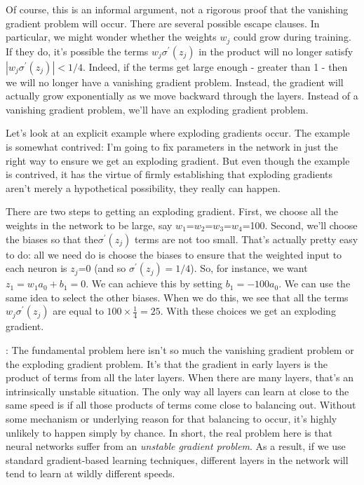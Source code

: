 Of course, this is an informal argument, not a rigorous proof that the vanishing gradient problem will occur. There are several possible escape clauses. In particular, we might wonder whether the weights $w_j$ could grow during training. If they do, it's possible the terms $w_{j} \sigma^{\prime}\left(z_{j}\right)$ in the product will no longer satisfy $\left|w_{j} \sigma^{\prime}\left(z_{j}\right)\right|<1 / 4$. Indeed, if the terms get large enough - greater than 1 - then we will no longer have a vanishing gradient problem. Instead, the gradient will actually grow exponentially as we move backward through the layers. Instead of a vanishing gradient problem, we'll have an exploding gradient problem.

 Let's look at an explicit example where exploding gradients occur. The example is somewhat contrived: I'm going to fix parameters in the network in just the right way to ensure we get an exploding gradient. But even though the example is contrived, it has the virtue of firmly establishing that exploding gradients aren't merely a hypothetical possibility, they really can happen.

There are two steps to getting an exploding gradient. First, we choose all the weights in the network to be large, say $w_1$=$w_2$=$w_3$=$w_4$=100. Second, we'll choose the biases so that the$\sigma^{\prime}\left(z_{j}\right)$ terms are not too small. That's actually pretty easy to do: all we need do is choose the biases to ensure that the weighted input to each neuron is $z_j$=0 (and so $\sigma^{\prime}\left(z_{j}\right)=1 / 4$). So, for instance, we want $z_{1}=w_{1} a_{0}+b_{1}=0$. We can achieve this by setting $b_{1}=-100  a_{0}$. We can use the same idea to select the other biases. When we do this, we see that all the terms $w_{j} \sigma^{\prime}\left(z_{j}\right)$ are equal to $100 \times\frac{1}{4}=25$. With these choices we get an exploding gradient.

: The fundamental problem here isn't so much the vanishing gradient problem or the exploding gradient problem. It's that the gradient in early layers is the product of terms from all the later layers. When there are many layers, that's an intrinsically unstable situation. The only way all layers can learn at close to the same speed is if all those products of terms come close to balancing out. Without some mechanism or underlying reason for that balancing to occur, it's highly unlikely to happen simply by chance. In short, the real problem here is that neural networks suffer from an \textit{unstable gradient problem}. As a result, if we use standard gradient-based learning techniques, different layers in the network will tend to learn at wildly different speeds.



